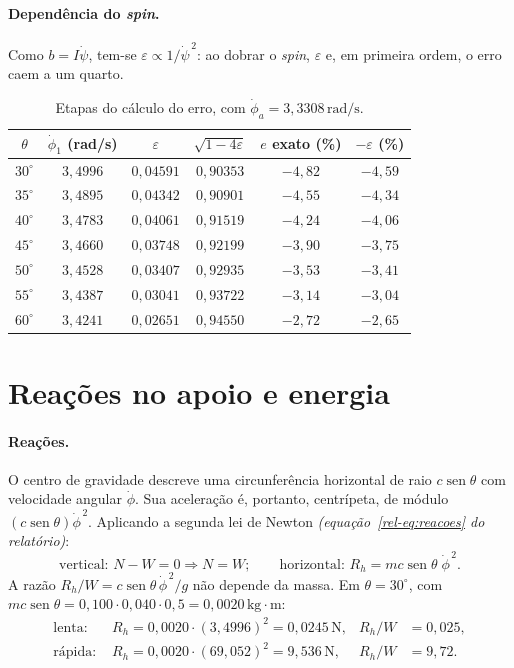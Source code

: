 \documentclass[11pt,a4paper]{article}
\newcommand{\seno}{\operatorname{sen}}
\newcommand{\un}[1]{\,\mathrm{#1}}
\newcommand{\phid}{\dot{\phi}}
\newcommand{\psid}{\dot{\psi}}
\newcommand{\eps}{\varepsilon}
\newcommand{\rel}[1]{\textit{(equação~\ref*{rel-eq:#1} do relatório)}}
\begin{document}
\paragraph{Dependência do \textit{spin}.} Como $b=I\psid$, tem-se $\eps\propto1/\psid^{\,2}$: ao dobrar o \textit{spin}, $\eps$ e, em primeira ordem, o erro caem a um quarto.

\begin{table}[H]
\centering\small
\caption{Etapas do cálculo do erro, com $\phid_a=3,3308\un{rad/s}$.}
\label{m:tab:erro}
\begin{tabular}{cccccc}
\toprule
$\theta$ & $\phid_1$ (rad/s) & $\eps$ & $\sqrt{1-4\eps}$ & $e$ exato (\%) & $-\eps$ (\%)\\
\midrule
$30^\circ$ & $3,4996$ & $0,04591$ & $0,90353$ & $-4,82$ & $-4,59$\\
$35^\circ$ & $3,4895$ & $0,04342$ & $0,90901$ & $-4,55$ & $-4,34$\\
$40^\circ$ & $3,4783$ & $0,04061$ & $0,91519$ & $-4,24$ & $-4,06$\\
$45^\circ$ & $3,4660$ & $0,03748$ & $0,92199$ & $-3,90$ & $-3,75$\\
$50^\circ$ & $3,4528$ & $0,03407$ & $0,92935$ & $-3,53$ & $-3,41$\\
$55^\circ$ & $3,4387$ & $0,03041$ & $0,93722$ & $-3,14$ & $-3,04$\\
$60^\circ$ & $3,4241$ & $0,02651$ & $0,94550$ & $-2,72$ & $-2,65$\\
\bottomrule
\end{tabular}
\end{table}

\section{Reações no apoio e energia}

\paragraph{Reações.} O centro de gravidade descreve uma circunferência horizontal de raio $c\seno\theta$ com velocidade angular $\phid$. Sua aceleração é, portanto, centrípeta, de módulo $(c\seno\theta)\phid^{\,2}$. Aplicando a segunda lei de Newton \rel{reacoes}:
\begin{equation}
\text{vertical: } N-W=0\Rightarrow N=W;\qquad\text{horizontal: } R_h=mc\seno\theta\;\phid^{\,2}.
\end{equation}
A razão $R_h/W=c\seno\theta\,\phid^{\,2}/g$ não depende da massa. Em $\theta=30^\circ$, com $mc\seno\theta=0,100\cdot0,040\cdot0,5=0,0020\un{kg\cdot m}$:
\begin{align}
\text{lenta: }&R_h=0,0020\cdot(3,4996)^2=0,0245\un{N},&R_h/W&=0,025,\\
\text{rápida: }&R_h=0,0020\cdot(69,052)^2=9,536\un{N},&R_h/W&=9,72.
\end{align}
\end{document}
